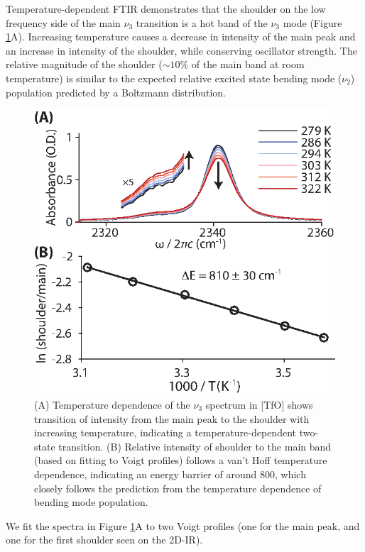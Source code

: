 Temperature-dependent FTIR demonstrates that the shoulder on the low frequency side of the main $\nu_3$ transition  is a hot band of the $\nu_3$ mode (Figure \ref{fig:hot band}A). Increasing temperature causes a decrease in intensity of the main peak and an increase in intensity of the shoulder, while conserving oscillator strength. The relative magnitude of the shoulder ($\sim 10\%$ of the main band at room temperature) is similar to the expected relative excited state bending mode ($\nu_2$) population predicted by a Boltzmann distribution.
\begin{figure}
	\includegraphics{./anions/fig3.eps}
	\caption[T-dependent FTIR of carbon dioxide in 1-butyl-3-methylimidazolium triflate]{\label{fig:hot band}(A) Temperature dependence of the $\nu_3$ spectrum in \ce{[Im_{4,1}]}[TfO] shows transition of intensity from the main peak to the shoulder with increasing temperature, indicating a temperature-dependent two-state transition. (B) Relative intensity of shoulder to the main band (based on fitting to Voigt profiles) follows a van't Hoff temperature dependence, indicating an energy barrier of around \SI{800}{\wavenumber}, which closely follows the prediction from the temperature dependence of bending mode population.}
\end{figure}
We fit the spectra in Figure \ref{fig:hot band}A to two Voigt profiles (one for the main peak, and one for the first shoulder seen on the 2D-IR).

